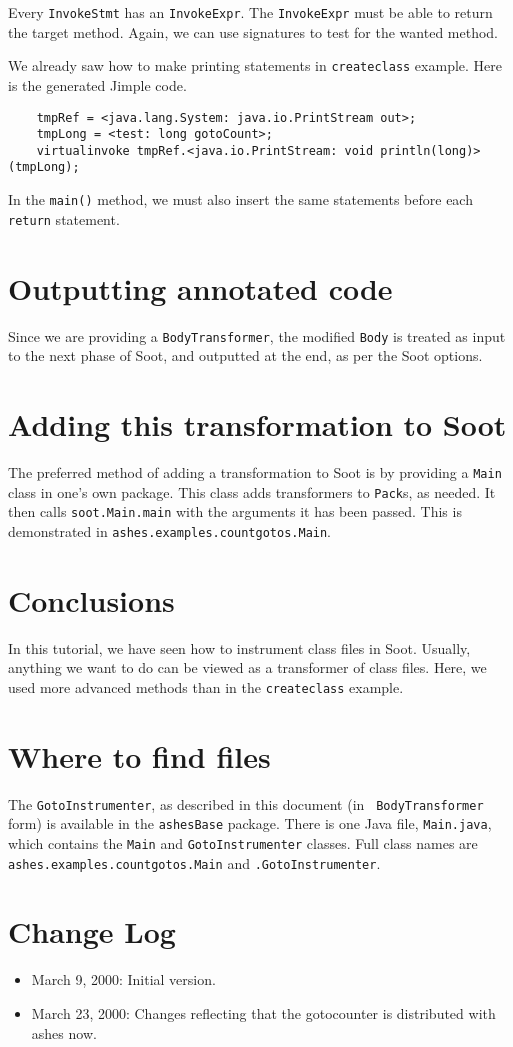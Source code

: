 \documentclass{article}
\begin{document}
Every {\tt InvokeStmt} has an {\tt InvokeExpr}. The 
{\tt InvokeExpr} must be able to return the target method. 
Again, we can use signatures to test for the wanted method. 

We already saw how to make printing statements in {\tt createclass}
example.  Here is the generated Jimple code.
\begin{verbatim}
    tmpRef = <java.lang.System: java.io.PrintStream out>;
    tmpLong = <test: long gotoCount>;
    virtualinvoke tmpRef.<java.io.PrintStream: void println(long)>(tmpLong);
\end{verbatim}

In the {\tt main()} method, we must also insert the same 
statements before each {\tt return} statement.

\section{Outputting annotated code}

Since we are providing a {\tt BodyTransformer}, the modified {\tt Body}
is treated as input to the next phase of Soot, and outputted at the end,
as per the Soot options.

\section{Adding this transformation to Soot}

The preferred method of adding a transformation to Soot is by providing a
{\tt Main} class in one's own package.  This class adds transformers
to {\tt Pack}s, as needed.  It then calls {\tt soot.Main.main} with
the arguments it has been passed.  This is demonstrated in 
{\tt ashes.examples.countgotos.Main}.

\section{Conclusions}

In this tutorial, we have seen how to instrument class files in Soot.
Usually, anything we want to do can be viewed as a transformer of
class files. Here, we used more advanced methods than in the {\tt createclass}
example.

\section*{Where to find files}

The {\tt GotoInstrumenter}, as described in this document (in {\tt
BodyTransformer} form) is available in the {\tt ashesBase} package.
There is one Java file, {\tt Main.java}, which contains the
{\tt Main} and {\tt GotoInstrumenter} classes.
Full class names are {\tt ashes.examples.countgotos.Main} and
{\tt .GotoInstrumenter}.

\section*{Change Log}
\begin{itemize}
\item March 9, 2000: Initial version.

\item March 23, 2000: Changes reflecting that the gotocounter is
distributed with ashes now.
\end{itemize}
\end{document}
